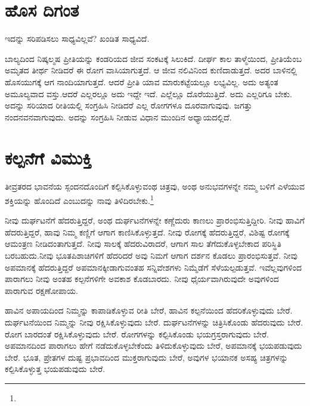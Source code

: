 \section*{ಹೊಸ ದಿಗಂತ}


ಇದನ್ನು ಸರಿಪಡಿಸಲು ಸಾಧ್ಯವಿಲ್ಲವೆ? ಖಂಡಿತ ಸಾಧ್ಯವಿದೆ.

ಬಾಲ್ಯದಿಂದ ನಿಷ್ಕಲ್ಮಷ ಪ್ರೀತಿಯನ್ನು ಕಂಡರಿಯದ ಜೀವ ಸಂಕಟಕ್ಕೆ ಸಿಲುಕಿದೆ. ದೀರ್ಘ ಕಾಲ ತಾಳ್ಮೆಯಿಂದ, ಪ್ರೀತಿಯೆಂಬ ಅಮೃತದ ತೀರ್ಥ ನೀಡಿದರೆ ಈ ರೋಗ ವಾಸಿಯಾಗುತ್ತದೆ. ಆ ಜೀವ ನಲಿವಿನಿಂದ ಕುಣಿದಾಡುತ್ತದೆ. ಅದರ ಬಾಳಿನಲ್ಲಿ ಹೊಸಯುಗಕ್ಕೆ ಆಗ ನಾಂದಿಯಾಗುತ್ತದೆ. ಆದರೆ ಪ್ರೀತಿ ಯಾವ ಮಾರುಕಟ್ಟೆಯಲ್ಲೂ ಲಭ್ಯವಿಲ್ಲ. ಅದು ಅತ್ಯಂತ ಅಮೂಲ್ಯವಾದ ವಸ್ತು.\break ಆದರೆ ಎಲ್ಲರಲ್ಲೂ ಅದು ಇದ್ದೇ ಇದೆ. ಎಲ್ಲೆಲ್ಲೂ ದೊರೆಯುತ್ತಿದೆ. ಅದು ಎಲ್ಲರಿಗೂ ಬೇಕು. ಅದನ್ನು ಸರಿಯಾದ ರೀತಿಯಲ್ಲಿ ಸಂಗ್ರಹಿಸಿ ನೀಡಿದರೆ ಎಲ್ಲ ರೋಗಗಳೂ ದೂರವಾಗುವುವು. ಜಗತ್ತು ನಂದನವನವಾಗುವುದು. ಅದನ್ನು ಸಂಗ್ರಹಿಸಿ ನೀಡುವ ವಿಧಾನ ಮುಂದಿನ ಅಧ್ಯಾಯ\-ದಲ್ಲಿದೆ.


\section*{ಕಲ್ಪನೆಗೆ ವಿಮುಕ್ತಿ}


ತೀವ್ರತರದ ಭಾವನೆಯ ಸ್ಪಂದನದೊಂದಿಗೆ ಕಲ್ಪಿಸಿಕೊಳ್ಳುವಂಥ ಚಿತ್ರವು, ಅಂಥ ಅನುಭವಗಳನ್ನೇ ನಮ್ಮ ಬಳಿಗೆ ಎಳೆಯುವ ಶಕ್ತಿಯನ್ನು ಹೊಂದಿದೆ ಎಂಬುದನ್ನು ನಾವು ತಿಳಿದಿರಬೇಕು.\footnote{\hfill{}}

ನೀವು ದುರ್ಘಟನೆಗೆ ಹೆದರುತ್ತಿದ್ದರೆ, ಅಂಥ ದುರ್ಘಟನೆಗಳನ್ನೇ ಕಣ್ಣೆದುರು ಕಾಣಲು ಪ್ರಾರಂಭಿಸುತ್ತಿದ್ದೀರಿ. ನೀವು ಹಾವಿಗೆ ಹೆದರುತ್ತಿದ್ದರೆ, ಹಾವು ನಿಮ್ಮ ಕಣ್ಣಿಗೆ ಆಗಾಗ ಕಾಣಿಸಿಕೊಳ್ಳುತ್ತದೆ. ನೀವು ರೋಗಕ್ಕೆ ಹೆದರುತ್ತಿದ್ದರೆ, ವಿಶಿಷ್ಟ ರೋಗಕ್ಕೆ ಆಮಂತ್ರಣ ನೀಡಿದಂತಾಗುತ್ತದೆ. ನೀವು ಸಾಲಕ್ಕೆ ಹೆದರುವಿರಾದರೆ, ಆಗಾಗ ಸಾಲ ತೆಗೆದುಕೊಳ್ಳಬೇಕಾದ ಪರಿಸ್ಥಿತಿ ಬರಬಹುದು.\break ನೀವು ಭೂತಪಿಶಾಚಿಗಳಿಗೆ ಹೆದರಿದರೆ ಅವು ನಿಮಗೆ ಆಗಾಗ ದರ್ಶನ ಕೊಡಲು ಪ್ರಾರಂಭಿಸುತ್ತವೆ. ನೀವು ಅಪಮಾನಕ್ಕೆ ಹೆದರುತ್ತಿದ್ದರೆ ಅಪಮಾನಕ್ಕೀಡಾಗುವಂತಹ ಸನ್ನಿವೇಶಗಳು ನಿಮ್ಮೆಡೆಗೆ ಸೆಳೆಯಲ್ಪಡುತ್ತವೆ. ಇವೆಲ್ಲವುಗಳಿಂದ ಪಾರಾ\-ಗಲು ನೀವು ಅಂತಹ ಕಲ್ಪನೆಗಳಿಗೇ ಅವಕಾಶ ಕೊಡಬಾರದು. ನೀವು ಧೈರ್ಯವಾಗಿರುವುದೇ ಅವುಗಳಿಂದ ಪಾರಾಗುವ ರಕ್ಷಣೋಪಾಯ.

ಹಾವಿನ ಅಪಾಯದಿಂದ ನಿಮ್ಮನ್ನು ಕಾಪಾಡಿಕೊಳ್ಳುವ ರೀತಿ ಬೇರೆ, ಹಾವಿನ ಕಲ್ಪನೆಯಿಂದ ಹೆದರಿಕೊಳ್ಳುವುದು ಬೇರೆ. ದುರ್ಘಟನೆಯಿಂದ ನಿಮ್ಮನ್ನು ನೀವು ರಕ್ಷಿಸಿಕೊಳ್ಳುವುದು ಬೇರೆ. ದುರ್ಘಟನೆಗಳನ್ನು ಚಿತ್ರಿಸಿಕೊಂಡು ಹೆದರುವುದು ಬೇರೆ. ರೋಗ ಬಾರದಂತೆ ರಕ್ಷಿಸಿಕೊಳ್ಳುವುದು ಬೇರೆ. ರೋಗಗಳನ್ನು ಕಲ್ಪಿಸಿಕೊಂಡು ಭಯಗ್ರಸ್ತರಾಗುವುದು ಬೇರೆ. ಅಪಮಾನದಿಂದ ಪಾರಾ\-ಗಲು ಹೇಗೆ ನಡೆದುಕೊಳ್ಳಬೇಕೆಂದು ತಿಳಿದುಕೊಳ್ಳುವುದು ಬೇರೆ, ಅಪಮಾನಕ್ಕೆ ಭಯಪಡುವುದು ಬೇರೆ. ಭೂತ, ಪ್ರೇತಗಳ ದುಷ್ಟ ಪ್ರಭಾವದಿಂದ ಮುಕ್ತರಾಗುವುದು ಬೇರೆ, ಅವುಗಳ ಭಯಾನಕ ಅಸಹ್ಯ ಚಿತ್ರಗಳನ್ನು ಕಲ್ಪಿಸಿಕೊಳ್ಳುತ್ತ ಭಯಪಡುವುದು ಬೇರೆ.

